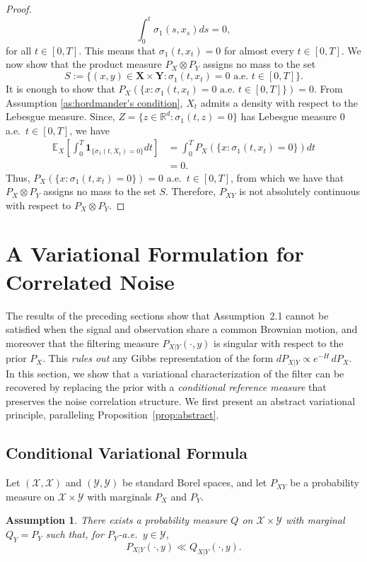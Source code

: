 \documentclass[12pt]{amsart}
\newtheorem{assumption}[theorem]{Assumption}
\theoremstyle{definition}
\theoremstyle{remark}
\begin{document}
\begin{proof}
    \[
        \int_0^t\sigma_1(s,x_s)ds = 0,
    \]
    for all $t\in[0,T]$. This means that $\sigma_1(t,x_t) = 0$ for almost every $t\in[0,T]$. We now show that the product measure $P_X\otimes P_Y$ assigns no mass to the set
    \[
        S := \{(x,y)\in\mathbf{X\times Y}: \sigma_1(t,x_t) = 0 \text{ a.e.\ } t\in[0,T]\}.
    \]
    It is enough to show that $P_X(\{x:\sigma_1(t,x_t) = 0 \text{ a.e.\ } t\in[0,T]\}) = 0$. From Assumption \ref{as:hordmander's condition}, $X_t$ admits a density with respect to the Lebesgue measure. Since, $Z = \{z\in\mathbb{R}^d:\sigma_1(t,z) = 0\}$ has Lebesgue measure 0 a.e.\ $t\in[0,T]$, we have
    \begin{align*}
\mathbb{E}_X\left[\int_0^T\mathbf{1}_{\{\sigma_1(t,X_t)=0\}}dt\right] &= \int_0^TP_X(\{x:\sigma_1(t,x_t)=0\})dt\\ &=0.
    \end{align*}
    Thus, $P_X(\{x:\sigma_1(t,x_t)=0\}) = 0$ a.e.\ $t\in[0,T]$, from which we have that $P_X \otimes P_Y$ assigns no mass to the set $S$. Therefore, $P_{XY}$ is not absolutely continuous with respect to $P_X \otimes P_Y$.
\end{proof}

\section{A Variational Formulation for Correlated Noise}
The results of the preceding sections show that Assumption~2.1 cannot be satisfied when the signal and observation share a common Brownian motion, and moreover that the filtering measure $P_{X|Y}(\cdot, y)$ is singular with respect to the prior $P_X$. This {\it rules out} any Gibbs representation of the form $dP_{X|Y} \propto e^{-H} \, dP_X$. In this section, we show that a variational characterization of the filter can be recovered by replacing the prior with a \emph{conditional reference measure} that preserves the noise correlation structure. We first present an abstract variational principle, paralleling Proposition~\ref{prop:abstract}.

\subsection{Conditional Variational Formula}
Let $(\mathcal{X}, \mathcal{X})$ and $(\mathcal{Y}, \mathcal{Y})$ be standard Borel spaces, and let $P_{XY}$ be a probability measure on $\mathcal{X} \times \mathcal{Y}$ with marginals $P_X$ and $P_Y$.

\begin{assumption}\label{ass:ref}
    There exists a probability measure $Q$ on $\mathcal{X} \times \mathcal{Y}$ with marginal $Q_Y = P_Y$ such that, for $P_Y$-a.e.\ $y \in \mathcal{Y}$,
    \[
        P_{X|Y}(\cdot, y) \ll Q_{X|Y}(\cdot, y).
    \]
\end{assumption}
\end{document}

